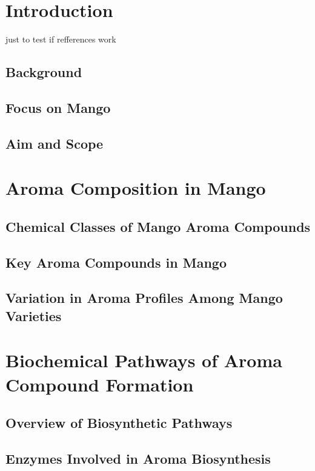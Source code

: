 \setcounter{chapter}{1}
\setcounter{section}{0}
\setlength{\headheight}{12.71342pt}
\addtolength{\topmargin}{-0.71342pt}

\section{Introduction}
just to test if refferences work \cite*{A01_Aguirre-Lopez_2023}
\subsection{Background}
\subsection{Focus on Mango}
\subsection{Aim and Scope}


\section{Aroma Composition in Mango}
\subsection{Chemical Classes of Mango Aroma Compounds}
\subsection{Key Aroma Compounds in Mango}
\subsection{Variation in Aroma Profiles Among Mango Varieties}


\section{Biochemical Pathways of Aroma Compound Formation}
\subsection{Overview of Biosynthetic Pathways}
\subsection{Enzymes Involved in Aroma Biosynthesis}
